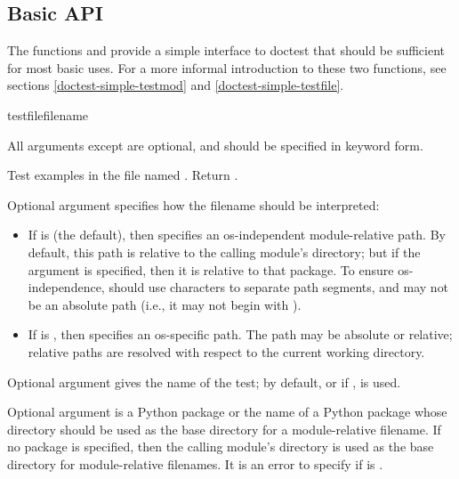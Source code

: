 \subsection{Basic API\label{doctest-basic-api}}

The functions  and  provide a
simple interface to doctest that should be sufficient for most basic
uses.  For a more informal introduction to these two functions, see
sections \ref{doctest-simple-testmod} and
\ref{doctest-simple-testfile}.

\begin{funcdesc}{testfile}{filename}

  All arguments except  are optional, and should be
  specified in keyword form.

  Test examples in the file named .  Return
  .

  Optional argument  specifies how the filename
  should be interpreted:

  \begin{itemize}
  \item If  is  (the default), then
         specifies an os-independent module-relative
        path.  By default, this path is relative to the calling
        module's directory; but if the  argument is
        specified, then it is relative to that package.  To ensure
        os-independence,  should use \code{/} characters
        to separate path segments, and may not be an absolute path
        (i.e., it may not begin with \code{/}).
  \item If  is , then 
        specifies an os-specific path.  The path may be absolute or
        relative; relative paths are resolved with respect to the
        current working directory.
  \end{itemize}

  Optional argument  gives the name of the test; by default,
  or if ,  is used.

  Optional argument  is a Python package or the name of a
  Python package whose directory should be used as the base directory
  for a module-relative filename.  If no package is specified, then
  the calling module's directory is used as the base directory for
  module-relative filenames.  It is an error to specify 
  if  is .


\end{funcdesc}
